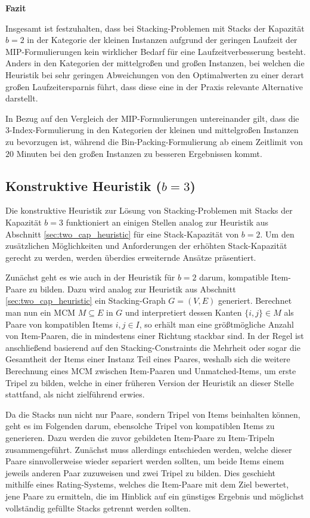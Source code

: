 \textbf{Fazit}

Insgesamt ist festzuhalten, dass bei Stacking-Problemen mit Stacks der Kapazität $b = 2$ in der Kategorie der kleinen Instanzen aufgrund der geringen Laufzeit der MIP-Formulierungen kein wirklicher Bedarf für eine Laufzeitverbesserung besteht. Anders in den Kategorien der mittelgroßen und großen Instanzen, bei welchen die Heuristik bei sehr geringen Abweichungen von den Optimalwerten zu einer derart großen Laufzeitersparnis führt, dass diese eine in der Praxis relevante Alternative darstellt.

In Bezug auf den Vergleich der MIP-Formulierungen untereinander gilt, dass die 3-Index-Formulierung in den Kategorien
der kleinen und mittelgroßen Instanzen zu bevorzugen ist, während die Bin-Packing-Formulierung ab einem Zeitlimit
von $20$ Minuten bei den großen Instanzen zu besseren Ergebnissen kommt.

\subsection{Konstruktive Heuristik ($b = 3$)}
\label{sec:three_cap_heuristic}

Die konstruktive Heuristik zur Lösung von Stacking-Problemen mit Stacks der Kapazität $b = 3$ funktioniert
an einigen Stellen analog zur Heuristik aus Abschnitt \ref{sec:two_cap_heuristic} für eine Stack-Kapazität von $b = 2$.
Um den zusätzlichen Möglichkeiten und Anforderungen der erhöhten Stack-Kapazität gerecht zu werden, werden überdies
erweiternde Ansätze präsentiert.

Zunächst geht es wie auch in der Heuristik für $b = 2$ darum, kompatible Item-Paare zu bilden.
Dazu wird analog zur Heuristik aus Abschnitt \ref{sec:two_cap_heuristic} ein Stacking-Graph $G = (V, E)$ generiert.
Berechnet man nun ein \textsc{MCM} $M \subseteq E$ in $G$ und interpretiert dessen Kanten $\{i, j\} \in M$ als Paare von kompatiblen Items
$i, j \in I$, so erhält man eine größtmögliche Anzahl von Item-Paaren, die in mindestens einer Richtung stackbar sind.
In der Regel ist anschließend basierend auf den Stacking-Constraints die Mehrheit oder sogar die Gesamtheit der Items einer Instanz Teil eines Paares, weshalb sich die weitere Berechnung eines \textsc{MCM} zwischen Item-Paaren und Unmatched-Items,
um erste Tripel zu bilden, welche in einer früheren Version der Heuristik an dieser Stelle stattfand, als nicht zielführend
erwies.

Da die Stacks nun nicht nur Paare, sondern Tripel von Items beinhalten können, geht es im Folgenden darum,
ebensolche Tripel von kompatiblen Items zu generieren. Dazu werden die zuvor gebildeten Item-Paare zu Item-Tripeln zusammengeführt.
Zunächst muss allerdings entschieden werden, welche dieser Paare sinnvollerweise wieder separiert werden sollten,
um beide Items einem jeweils anderen Paar zuzuweisen und zwei Tripel zu bilden. Dies geschieht mithilfe eines Rating-Systems, welches die Item-Paare mit dem Ziel bewertet, jene Paare zu ermitteln, die im Hinblick auf ein günstiges Ergebnis
und möglichst vollständig gefüllte Stacks getrennt werden sollten.

